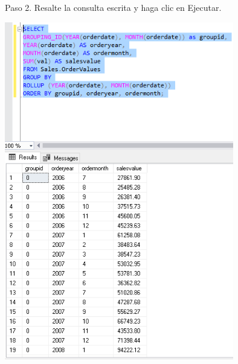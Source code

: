 \begin{flushleft}
\textbf{}\\
\textbf{}\\
\textbf{}\\
\textbf{}\\
\textbf{}\\
\textbf{}\\
\textbf{}\\
Paso 2. Resalte la consulta escrita y haga clic en Ejecutar.
\begin{center}
	\includegraphics[width=10cm]{./Imagenes/6img8} 
	\end{center}
\textbf{}\\
\textbf{}\\








\end{flushleft}